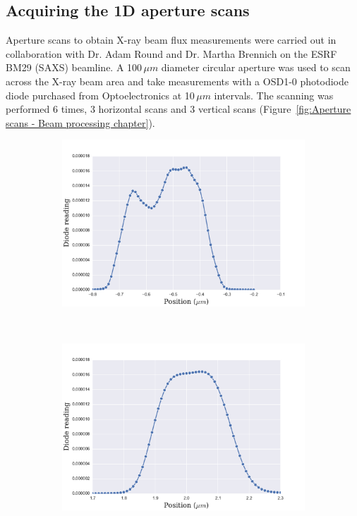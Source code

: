 \subsection{Acquiring the 1D aperture scans}
\label{sub:Acquiring the 1D aperture scans}
Aperture scans to obtain X-ray beam flux measurements were carried out in collaboration with Dr. Adam Round and Dr. Martha Brennich on the ESRF BM29 (SAXS) beamline.
A 100$\,\mu m$ diameter circular aperture was used to scan across the X-ray beam area and take measurements with a OSD1-0 photodiode diode purchased from Optoelectronics at 10$\,\mu m$ intervals.
The scanning was performed 6 times, 3 horizontal scans and 3 vertical scans (Figure~\ref{fig:Aperture scans - Beam processing chapter}).
\begin{figure}
    \centering
    \begin{subfigure}[b]{0.9\textwidth}
            \centering
            \includegraphics[width=\textwidth]{figures/beam/SAXS_vertical_aperture_scan.pdf}
            \caption{}
            \label{fig:Vertical aperture scans - Beam processing chapter}
    \end{subfigure}
    \\
    \begin{subfigure}[b]{0.9\textwidth}
            \centering
            \includegraphics[width=\textwidth]{figures/beam/SAXS_horizontal_aperture_scan.pdf}

\end{subfigure}
\end{figure}
